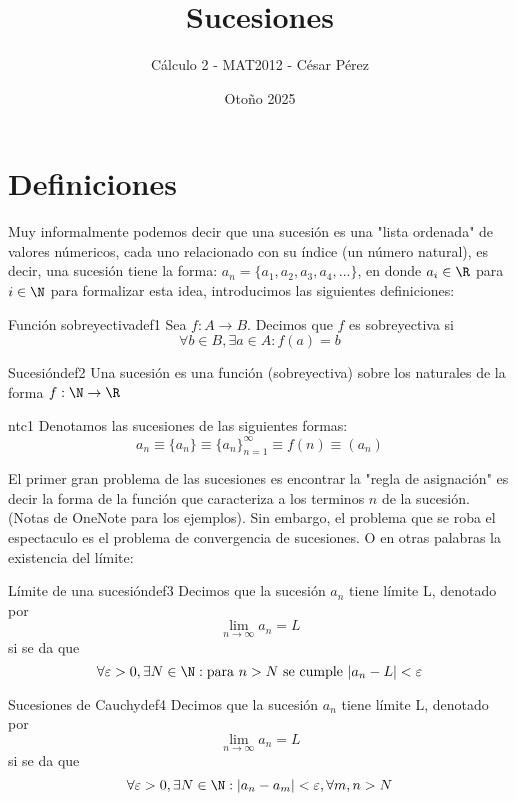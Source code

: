 \documentclass[12pt,a4paper]{article}
\title{\Huge Sucesiones}
\author{Cálculo 2 - MAT2012 - César Pérez}
\date{Otoño 2025}
\begin{document}
\maketitle

\section{Definiciones}
Muy informalmente podemos decir que una sucesión es una "lista ordenada" de valores númericos, cada uno relacionado con su índice (un número natural), es decir, una sucesión tiene la forma: $a_n = \{a_1, a_2, a_3, a_4, ...\}$, en donde $a_i \in \R$ para $i \in \N$ para formalizar esta idea, introducimos las siguientes definiciones:

\begin{definicion}{Función sobreyectiva}{def1}
    Sea $f: A \to B$. Decimos que $f$ es sobreyectiva si 
    \[
        \forall b \in B, \exists a \in A: f(a) = b
    \]
\end{definicion}

\begin{definicion}{Sucesión}{def2}
    Una sucesión es una función (sobreyectiva) sobre los naturales de la forma $f: \N \to \R$ 
\end{definicion}

\begin{notacion}{}{ntc1}
    Denotamos las sucesiones de las siguientes formas:
    \[ 
        a_n \equiv \{a_n\} \equiv \{a_n\}_{n = 1}^{\infty} \equiv f(n) \equiv (a_n)
    \]
\end{notacion}

El primer gran problema de las sucesiones es encontrar la "regla de asignación" es decir la forma de la función que caracteriza a los terminos $n$ de la sucesión. (Notas de OneNote para los ejemplos). Sin embargo, el problema que se roba el espectaculo es el problema de convergencia de sucesiones. O en otras palabras la existencia del límite: 
    
\begin{definicion}{Límite de una sucesión}{def3}
    Decimos que la sucesión $a_n$ tiene límite L, denotado por
    \[ 
        \lim_{n \to \infty} a_n = L
    \]
    si se da que 
    \[ 
        \forall \varepsilon > 0, \exists N \in \N: \text{para } n > N \text{ se cumple } \lvert a_n - L \rvert < \varepsilon
    \]
\end{definicion}

\begin{definicion}{Sucesiones de Cauchy}{def4}
    Decimos que la sucesión $a_n$ tiene límite L, denotado por
    \[ 
        \lim_{n \to \infty} a_n = L
    \]
    si se da que 
    \[ 
        \forall \varepsilon > 0, \exists N \in \N: \lvert a_n - a_m \rvert < \varepsilon, \forall m,n > N 
    \]
\end{definicion}
\end{document}
